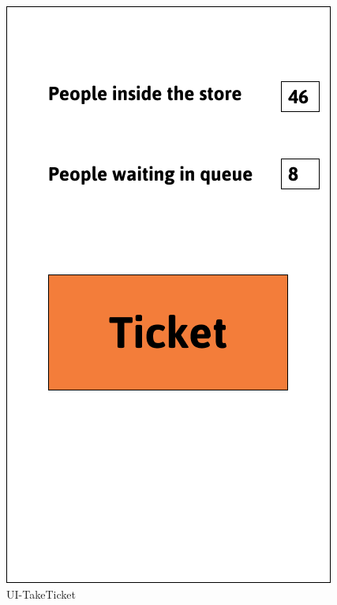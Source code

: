 \documentclass[a4paper,12pt]{report}
\begin{document}
\begin{figure}[H]
\begin{minipage}[t]{0.56\linewidth}
		\includegraphics[scale=0.56]{UI-TakeTicket}
		\caption{UI-TakeTicket}
		\label{fig:UI-TakeTicket}
	\end{minipage}
\end{figure}
\end{document}
